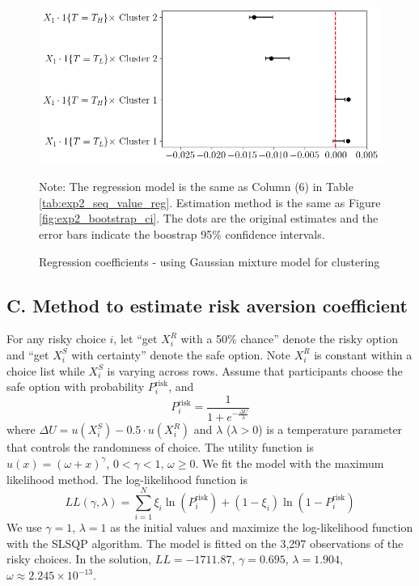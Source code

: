 \documentclass[
  12pt,
]{article}
\begin{document}
\begin{figure} 
\centering
\includegraphics[width=0.85\linewidth]{figures/exp2_bootstrap_ci_label_gmm_fe.png}
\caption{Regression coefficients - using Gaussian mixture model for clustering}
\vspace*{4pt}
\centering

\begin{minipage}{1.0\textwidth}
{\par\footnotesize Note: The regression model is the same as Column (6) in Table \ref{tab:exp2_seq_value_reg}. Estimation method is the same as Figure \ref{fig:exp2_bootstrap_ci}. The dots are the original estimates and the error bars indicate the boostrap 95\% confidence intervals. }
\end{minipage}
\label{fig:exp2_bootstrap_ci_gmm}
\end{figure}

\newpage

\hypertarget{c.-method-to-estimate-risk-aversion-coefficient}{%
\subsection*{C. Method to estimate risk aversion
coefficient}\label{c.-method-to-estimate-risk-aversion-coefficient}}

For any risky choice \(i\), let ``get \(X_i^R\) with a 50\% chance''
denote the risky option and ``get \(X_i^S\) with certainty'' denote the
safe option. Note \(X_i^R\) is constant within a choice list while
\(X_i^S\) is varying across rows. Assume that participants choose the
safe option with probability \(P_i^{\text{risk}}\), and\[
P_i^{\text{risk}} = \frac{1}{1+e^{-\frac{\Delta U}{\lambda}}}
\]where \(\Delta U = u(X_i^S) - 0.5\cdot u(X_i^R)\) and \(\lambda\)
(\(\lambda >0\)) is a temperature parameter that controls the randomness
of choice. The utility function is \(u(x)=(\omega+x)^\gamma\),
\(0<\gamma<1\), \(\omega\geq 0\). We fit the model with the maximum
likelihood method. The log-likelihood function is\[
LL(\gamma,\lambda) = \sum_{i=1}^N \xi_i\ln(P_i^{\text{risk}})+(1-\xi_i)\ln(1-P_i^{\text{risk}}) 
\]We use \(\gamma=1\), \(\lambda =1\) as the initial values and maximize
the log-likelihood function with the SLSQP algorithm. The model is
fitted on the 3,297 observations of the risky choices. In the solution,
\(LL=-1711.87\), \(\gamma=0.695\), \(\lambda=1.904\),
\(\omega\approx 2.245\times10^{-13}\).
\end{document}
